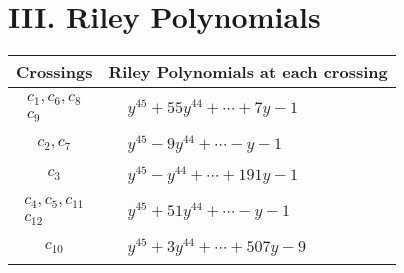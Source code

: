 \documentclass[1p]{elsarticle_modified}
\theoremstyle{definition}
\begin{document}
\centering \section*{ III. Riley Polynomials}
\begin{tabular}{m{50pt}|m{274pt}}
Crossings & \hspace{64pt}Riley Polynomials at each crossing \\
\hline $$\begin{aligned}c_{1},c_{6},c_{8}\\c_{9}\end{aligned}$$&$\begin{aligned}
&y^{45}+55 y^{44}+\cdots+7 y-1
\end{aligned}$\\
\hline $$\begin{aligned}c_{2},c_{7}\end{aligned}$$&$\begin{aligned}
&y^{45}-9 y^{44}+\cdots- y-1
\end{aligned}$\\
\hline $$\begin{aligned}c_{3}\end{aligned}$$&$\begin{aligned}
&y^{45}- y^{44}+\cdots+191 y-1
\end{aligned}$\\
\hline $$\begin{aligned}c_{4},c_{5},c_{11}\\c_{12}\end{aligned}$$&$\begin{aligned}
&y^{45}+51 y^{44}+\cdots- y-1
\end{aligned}$\\
\hline $$\begin{aligned}c_{10}\end{aligned}$$&$\begin{aligned}
&y^{45}+3 y^{44}+\cdots+507 y-9
\end{aligned}$\\
\hline
\end{tabular}
\vskip 2pc
\end{document}
